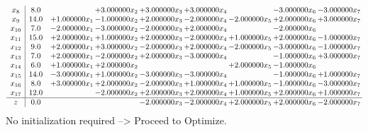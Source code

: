 \documentclass[10pt]{article}
\begin{document}
\[\begin{array}{c| c c@{\hskip 2pt} c@{\hskip 2pt} c@{\hskip 2pt} c@{\hskip 2pt} c@{\hskip 2pt} c@{\hskip 2pt} c@{\hskip 2pt} }
 x_{8}   &  8.0  &   & + 3.000000 x_{2} & + 3.000000 x_{3} & + 3.000000 x_{4} &   & -3.000000 x_{6} & -3.000000 x_{7}\\
 x_{9}   &  14.0 & + 1.000000 x_{1} & -1.000000 x_{2} & + 2.000000 x_{3} & -2.000000 x_{4} & -2.000000 x_{5} & + 2.000000 x_{6} & + 3.000000 x_{7}\\
 x_{10}   &  7.0 & -2.000000 x_{1} & -3.000000 x_{2} & -2.000000 x_{3} & + 2.000000 x_{4} &   & -2.000000 x_{6} &   \\
 x_{11}   &  15.0 & + 2.000000 x_{1} & + 1.000000 x_{2} & + 2.000000 x_{3} & -2.000000 x_{4} & + 1.000000 x_{5} & + 2.000000 x_{6} & -1.000000 x_{7}\\
 x_{12}   &  9.0 & + 2.000000 x_{1} & + 3.000000 x_{2} & -2.000000 x_{3} & + 2.000000 x_{4} & -2.000000 x_{5} & -3.000000 x_{6} & -1.000000 x_{7}\\
 x_{13}   &  7.0 & + 2.000000 x_{1} & -2.000000 x_{2} & + 2.000000 x_{3} & -3.000000 x_{4} &   & -1.000000 x_{6} & + 3.000000 x_{7}\\
 x_{14}   &  6.0 & + 1.000000 x_{1} & + 2.000000 x_{2} &    &   & + 2.000000 x_{5} & -1.000000 x_{6} &   \\
 x_{15}   &  14.0 & -3.000000 x_{1} & + 1.000000 x_{2} & -3.000000 x_{3} & -3.000000 x_{4} &   & -1.000000 x_{6} & + 1.000000 x_{7}\\
 x_{16}   &  8.0 & + 3.000000 x_{1} & + 2.000000 x_{2} & -2.000000 x_{3} & + 1.000000 x_{4} & + 1.000000 x_{5} & -1.000000 x_{6} & -3.000000 x_{7}\\
 x_{17}   &  12.0  &   & -2.000000 x_{2} & + 2.000000 x_{3} & + 2.000000 x_{4} & + 1.000000 x_{5} & + 2.000000 x_{6} & + 1.000000 x_{7}\\
\hline
z    &  0.0  &    &   & -2.000000 x_{3} & -2.000000 x_{4} & + 2.000000 x_{5} & + 2.000000 x_{6} & -2.000000 x_{7}\\
\end{array}\]
No initialization required --> Proceed to Optimize. 
\end{document}
